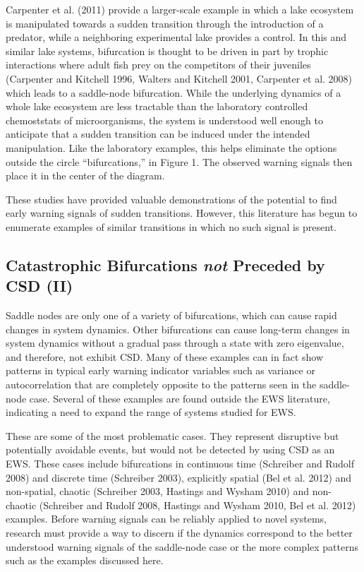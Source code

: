 \documentclass{article}
\begin{document}
Carpenter et al. (2011) provide a larger-scale example in which a lake
ecosystem is manipulated towards a sudden transition through the
introduction of a predator, while a neighboring experimental lake
provides a control. In this and similar lake systems, bifurcation is
thought to be driven in part by trophic interactions where adult fish
prey on the competitors of their juveniles (Carpenter and Kitchell 1996,
Walters and Kitchell 2001, Carpenter et al. 2008) which leads to a
saddle-node bifurcation. While the underlying dynamics of a whole lake
ecosystem are less tractable than the laboratory controlled chemoststats
of microorganisms, the system is understood well enough to anticipate
that a sudden transition can be induced under the intended manipulation.
Like the laboratory examples, this helps eliminate the options outside
the circle ``bifurcations,'' in Figure 1. The observed warning signals
then place it in the center of the diagram.

These studies have provided valuable demonstrations of the potential to
find early warning signals of sudden transitions. However, this
literature has begun to enumerate examples of similar transitions in
which no such signal is present.

\subsection{Catastrophic Bifurcations \emph{not} Preceded by CSD (II)}

Saddle nodes are only one of a variety of bifurcations, which can cause
rapid changes in system dynamics. Other bifurcations can cause long-term
changes in system dynamics without a gradual pass through a state with
zero eigenvalue, and therefore, not exhibit CSD. Many of these examples
can in fact show patterns in typical early warning indicator variables
such as variance or autocorrelation that are completely opposite to the
patterns seen in the saddle-node case. Several of these examples are
found outside the EWS literature, indicating a need to expand the range
of systems studied for EWS.

These are some of the most problematic cases. They represent disruptive
but potentially avoidable events, but would not be detected by using CSD
as an EWS. These cases include bifurcations in continuous time
(Schreiber and Rudolf 2008) and discrete time (Schreiber 2003),
explicitly spatial (Bel et al. 2012) and non-spatial, chaotic (Schreiber
2003, Hastings and Wysham 2010) and non-chaotic (Schreiber and Rudolf
2008, Hastings and Wysham 2010, Bel et al. 2012) examples. Before
warning signals can be reliably applied to novel systems, research must
provide a way to discern if the dynamics correspond to the better
understood warning signals of the saddle-node case or the more complex
patterns such as the examples discussed here.
\end{document}
